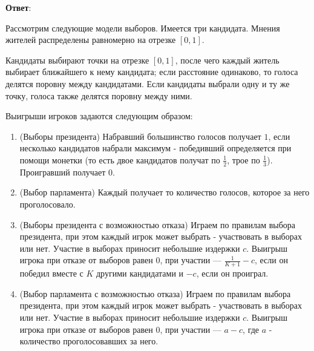 \textbf{Ответ}: 


\solution %

\task
Рассмотрим следующие модели выборов. Имеется три кандидата. Мнения жителей распределены равномерно на отрезке $[0,1]$.

Кандидаты выбирают точки на отрезке $[0,1]$, после чего каждый житель выбирает ближайшего к нему кандидата; если расстояние одинаково, то голоса делятся поровну между кандидатами. Если кандидаты выбрали одну и ту же точку, голоса также делятся поровну между ними.

Выигрыши игроков задаются следующим образом:
\begin{enumerate}[label=--]
	\item (Выборы президента) Набравший большинство голосов получает $1$, если несколько кандидатов набрали максимум - победивший определяется при помощи монетки (то есть двое кандидатов получат по $\frac{1}{2}$, трое по $\frac{1}{3}$). Проигравший получает $0$.
	\item (Выбор парламента) Каждый получает то количество голосов, которое за него проголосовало.
	\item (Выборы президента с возможностью отказа) Играем по правилам выбора президента, при этом каждый игрок может выбрать - участвовать в выборах или нет. Участие в выборах приносит небольшие издержки $c$. Выигрыш игрока при отказе от выборов равен $0$, при участии --- $\frac{1}{K+1}-c$, если он победил вместе с $K$ другими кандидатами и $-c$, если он проиграл.
	\item (Выбор парламента с возможностью отказа) Играем по правилам выбора президента, при этом каждый игрок может выбрать - участвовать в выборах или нет. Участие в выборах приносит небольшие издержки $c$. Выигрыш игрока при отказе от выборов равен $0$, при участии --- $a-c$, где $a$ - количество проголосовавших за него.
\end{enumerate}

